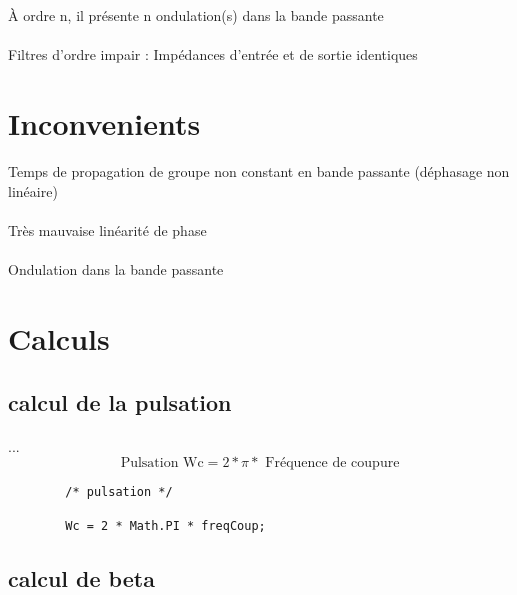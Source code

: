 \documentclass[a4paper,11pt]{article}
\begin{document}
    \paragraph{}
À ordre n, il présente n ondulation(s) dans la bande passante
    \paragraph{}
Filtres d’ordre impair : Impédances d’entrée et de sortie identiques


\section{Inconvenients}
    \paragraph{}
Temps de propagation de groupe non constant en bande passante (déphasage non linéaire)
    \paragraph{}
Très mauvaise linéarité de phase
    \paragraph{}
Ondulation dans la bande passante

    \clearpage

\section{Calculs}
\subsection{calcul de la pulsation}
    \paragraph{}
    ...\[ \mbox{Pulsation Wc} = 2 * \pi * \mbox{ Fréquence de coupure}\]
    \begin{lstlisting}
        /* pulsation */

        Wc = 2 * Math.PI * freqCoup;

    \end{lstlisting}

\subsection{calcul de beta}
\end{document}
